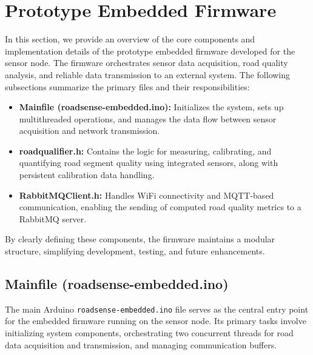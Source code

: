 \section{Prototype Embedded Firmware}

In this section, we provide an overview of the core components and implementation details of the prototype embedded firmware developed for the sensor node. The firmware orchestrates sensor data acquisition, road quality analysis, and reliable data transmission to an external system.
The following subsections summarize the primary files and their responsibilities:

\begin{itemize}
    \item \textbf{Mainfile (roadsense-embedded.ino):} Initializes the system, sets up multithreaded operations, and manages the data flow between sensor acquisition and network transmission.
    \item \textbf{roadqualifier.h:} Contains the logic for measuring, calibrating, and quantifying road segment quality using integrated sensors, along with persistent calibration data handling.
    \item \textbf{RabbitMQClient.h:} Handles WiFi connectivity and MQTT-based communication, enabling the sending of computed road quality metrics to a RabbitMQ server.
\end{itemize}

By clearly defining these components, the firmware maintains a modular structure, simplifying development, testing, and future enhancements.

\subsection{Mainfile (roadsense-embedded.ino)}

The main Arduino \texttt{roadsense-embedded.ino} file serves as the central entry point for the embedded firmware running on the sensor node. Its primary tasks involve initializing system components, orchestrating two concurrent threads for road data acquisition and transmission, and managing communication buffers.

